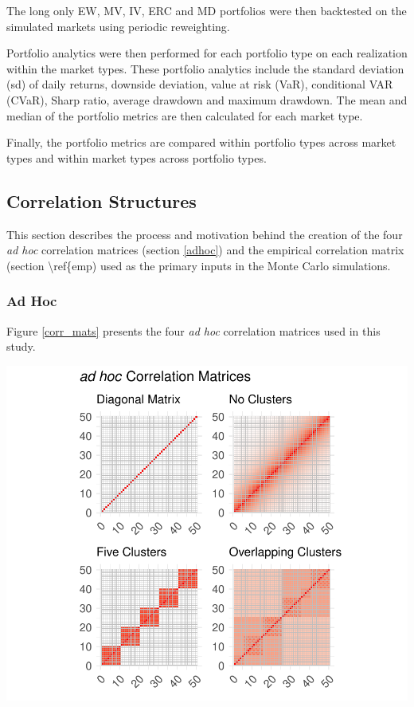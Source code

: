 \documentclass[11pt,preprint, authoryear]{elsarticle}
\let\origfigure\figure
\let\endorigfigure\endfigure
\renewenvironment{figure}[1][2] {
    \expandafter\origfigure\expandafter[H]
} {
    \endorigfigure
}
\numberwithin{equation}{section}
\numberwithin{figure}{section}
\numberwithin{table}{section}
\begin{document}
The long only EW, MV, IV, ERC and MD portfolios were then backtested on
the simulated markets using periodic reweighting.

Portfolio analytics were then performed for each portfolio type on each
realization within the market types. These portfolio analytics include
the standard deviation (sd) of daily returns, downside deviation, value
at risk (VaR), conditional VAR (CVaR), Sharp ratio, average drawdown and
maximum drawdown. The mean and median of the portfolio metrics are then
calculated for each market type.

Finally, the portfolio metrics are compared within portfolio types
across market types and within market types across portfolio types.

\hypertarget{correlation-structures}{%
\subsection{\texorpdfstring{Correlation Structures
\label{corr_struc}}{Correlation Structures }}\label{correlation-structures}}

This section describes the process and motivation behind the creation of
the four \emph{ad hoc} correlation matrices (section \ref{adhoc}) and
the empirical correlation matrix (section \textbackslash ref\{emp) used
as the primary inputs in the Monte Carlo simulations.

\hypertarget{ad-hoc}{%
\subsubsection{\texorpdfstring{Ad Hoc
\label{adhoc}}{Ad Hoc }}\label{ad-hoc}}

Figure \ref{corr_mats} presents the four \emph{ad hoc} correlation
matrices used in this study.

\begin{figure}
\centering
\includegraphics{Thesis_files/figure-latex/corr mats-1.pdf}
\caption{\label{corr_mats} Correlation Matricies}
\end{figure}
\end{document}
